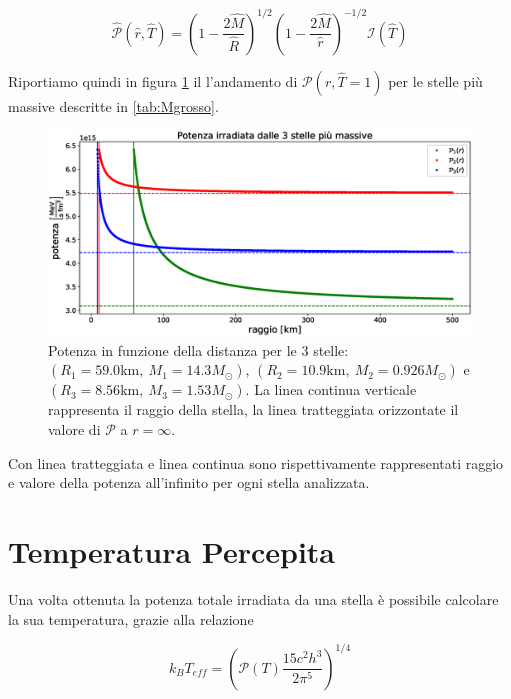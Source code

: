 \documentclass[a4paper, titlepage]{article}
\begin{document}
\begin{equation}
    \mathcal{\hat P} (\hat r, \hat T) = \left(1 - \frac{2 \hat M}{\hat R} \right)^{1/2} \left(1 - \frac{2 \hat M}{\hat r} \right)^{-1/2} \mathcal I (\hat T)
    \label{eq:Pot_I}
\end{equation}

Riportiamo quindi in figura \ref{fig:Pot} il l'andamento di $\mathcal P (r, \hat T = 1)$ per le stelle più massive descritte in \ref{tab:Mgrosso}.

\begin{figure}[h]
    \centering
    \includegraphics[width = \textwidth]{Figures/Pot.eps}
    \caption{Potenza in funzione della distanza per le 3 stelle: $(R_1 = 59.0 \unit{\kilo\meter},~M_1 = 14.3 M_\odot)$, $(R_2 = 10.9 \unit{\kilo\meter},~M_2 = 0.926 M_\odot)$ e $(R_3 = 8.56 \unit{\kilo\meter},~M_3 = 1.53 M_\odot)$.
    La linea continua verticale rappresenta il raggio della stella, la linea tratteggiata orizzontate il valore di $\mathcal{P}$ a $r = \infty$.}
    \label{fig:Pot}
\end{figure}

Con linea tratteggiata e linea continua sono rispettivamente rappresentati raggio e valore della potenza all'infinito per ogni stella analizzata.



\newpage


\section{Temperatura Percepita}
\label{sec:temp_perc}

Una volta ottenuta la potenza totale irradiata da una stella è possibile calcolare la sua temperatura, grazie alla relazione

\begin{equation}
    k_B T_{eff} = \left( \mathcal{P} (T) \frac{15 c^2 h^3}{2 \pi^5} \right)^{1/4}
    \label{eq:Teff}
\end{equation}
\end{document}
